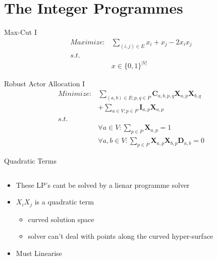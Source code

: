\documentclass{beamer}
\begin{document}
\section{The Integer Programmes}

\begin{frame}{Max-Cut I}
\begin{align}
	\nonumber Maximize: & \sum_{(i,j) \in E}{x_i + x_j - 2 x_i x_j} \\
	\nonumber s.t. & \\
	\nonumber & x \in \{0,1\}^{|V|}
\end{align}
\end{frame}

\begin{frame}{Robust Actor Allocation I}
\begin{align}
	\nonumber Minimize: & \sum_{(a,b) \in E; p,q \in P} \mathbf{C}_{a,b,p,q}\mathbf{X}_{a,p}\mathbf{X}_{b,q} \\
	\nonumber & + \sum_{a \in V; p \in P} \mathbf{I}_{a,p}\mathbf{X}_{a,p} \\
	\nonumber s.t. &  \\
	\nonumber & \forall a \in V : \sum_{p \in P}\mathbf{X}_{a,p} = 1 \\
	\nonumber & \forall a,b \in V : \sum_{p \in P}\mathbf{X}_{a,p}\mathbf{X}_{b,p}\mathbf{D}_{a,b} = 0
\end{align}
\end{frame}

\begin{frame}{Quadratic Terms}
\begin{columns}
\begin{column}{5cm}
\begin{itemize}
	\item These LP's cant be solved by a lienar programme solver
	\item $X_i X_j$ is a quadratic term
	\begin{itemize}
		\item curved solution space
		\item solver can't deal with points along the curved hyper-surface
	\end{itemize}
	\item Must Linearise
\end{itemize}
\end{column}
\begin{column}{5cm}
\end{column}
\end{columns}
\end{frame}
\end{document}
